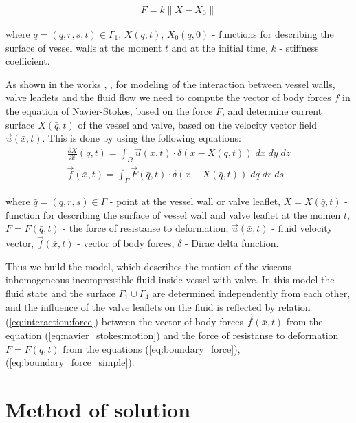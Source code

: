 \documentclass[runningheads,a4paper]{llncs}
\begin{document}
\begin{gather}
    \label{eq:boundary_force_simple}
    F = k \|X - X_0\|
\end{gather}

where $\bar{q} = (q, r, s, t) \in \Gamma_1$, $X(\bar{q}, t)$, $X_0(\bar{q}, 0)$ - functions for describing the surface of vessel walls at the moment $t$ and at the initial time, $k$ - stiffness coefficient.

As shown in the works \cite{pescin_1977}, \cite{boyce_2011}, for modeling of the interaction between vessel walls, valve leaflets and the fluid flow we need
to compute the vector of body forces $f$ in the equation of Navier-Stokes, based on the force $F$, and determine current surface $X(\bar{q}, t)$ of the vessel and valve, based on the velocity vector field $\vec{u}(\bar{x}, t)$. This is done by using the following equations:
\begin{gather}
    \label{eq:interaction:velocity}
    \frac{\partial X}{\partial t}(\bar{q}, t) = \int_{\Omega} \vec{u}(\bar{x}, t) \cdot \delta (x - X(\bar{q}, t))\; dx\; dy\; dz\\
    \label{eq:interaction:force}
    \vec{f}(\bar{x}, t) = \int_{\Gamma} \vec{F}(\bar{q}, t) \cdot \delta (x - X(\bar{q}, t))\; dq\; dr\; ds
\end{gather}

where $\bar{q} = (q, r, s) \in \Gamma$ - point at the vessel wall or valve leaflet, $X = X(\bar{q}, t)$ - function for describing the surface
of vessel wall and valve leaflet at the momen $t$, $F = F(\bar{q}, t)$ - the force of resistanse to deformation,
$\vec{u}(\bar{x}, t)$ - fluid velocity vector, $\vec{f}(\bar{x}, t)$ - vector of body forces, $\delta$ - Dirac delta function.

Thus we build the model, which describes the motion of the viscous inhomogeneous incompressible fluid inside vessel with valve. In this model the fluid state
and the surface $\Gamma_1 \cup \Gamma_4$ are determined independently from each other, and the influence of the valve leaflets on the fluid is reflected by
relation (\ref{eq:interaction:force}) between the vector of body forces $\vec{f}(\bar{x}, t)$ from the equation (\ref{eq:navier_stokes:motion}) and the force of resistanse to deformation $F = F(\bar{q}, t)$ from the equations (\ref{eq:boundary_force}), (\ref{eq:boundary_force_simple}).

\section{Method of solution}
\end{document}
